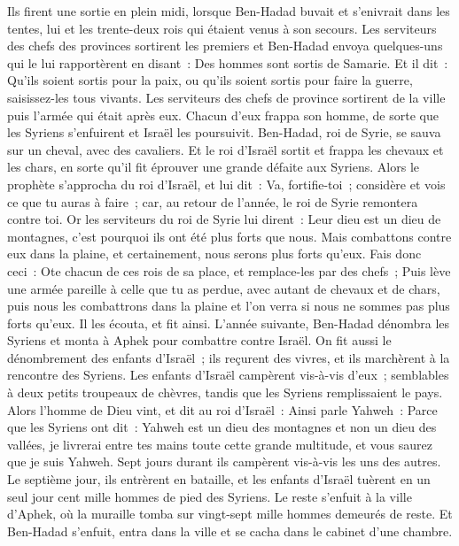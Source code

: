 \begin{multicols}{2}
Ils firent une sortie en plein midi, lorsque Ben-Hadad buvait et s'enivrait dans les tentes, lui et les trente-deux rois qui étaient venus à son secours.
Les serviteurs des chefs des provinces sortirent les premiers et Ben-Hadad envoya quelques-uns qui le lui rapportèrent en disant~: Des hommes sont sortis de Samarie.
Et il dit~: Qu'ils soient sortis pour la paix, ou qu'ils soient sortis pour faire la guerre, saisissez-les tous vivants.
Les serviteurs des chefs de province sortirent de la ville puis l'armée qui était après eux.
Chacun d'eux frappa son homme, de sorte que les Syriens s'enfuirent et Israël les poursuivit. Ben-Hadad, roi de Syrie, se sauva sur un cheval, avec des cavaliers.
Et le roi d'Israël sortit et frappa les chevaux et les chars, en sorte qu'il fit éprouver une grande défaite aux Syriens.
Alors le prophète s'approcha du roi d'Israël, et lui dit~: Va, fortifie-toi~; considère et vois ce que tu auras à faire~; car, au retour de l'année, le roi de Syrie remontera contre toi.
Or les serviteurs du roi de Syrie lui dirent~: Leur dieu est un dieu de montagnes, c'est pourquoi ils ont été plus forts que nous. Mais combattons contre eux dans la plaine, et certainement, nous serons plus forts qu'eux.
Fais donc ceci~: Ote chacun de ces rois de sa place, et remplace-les par des chefs~;
Puis lève une armée pareille à celle que tu as perdue, avec autant de chevaux et de chars, puis nous les combattrons dans la plaine et l'on verra si nous ne sommes pas plus forts qu'eux. Il les écouta, et fit ainsi.
L'année suivante, Ben-Hadad dénombra les Syriens et monta à Aphek pour combattre contre Israël.
On fit aussi le dénombrement des enfants d'Israël~; ils reçurent des vivres, et ils marchèrent à la rencontre des Syriens. Les enfants d'Israël campèrent vis-à-vis d'eux~; semblables à deux petits troupeaux de chèvres, tandis que les Syriens remplissaient le pays.
Alors l'homme de Dieu vint, et dit au roi d'Israël~: Ainsi parle Yahweh~: Parce que les Syriens ont dit~: Yahweh est un dieu des montagnes et non un dieu des vallées, je livrerai entre tes mains toute cette grande multitude, et vous saurez que je suis Yahweh.
Sept jours durant ils campèrent vis-à-vis les uns des autres. Le septième jour, ils entrèrent en bataille, et les enfants d'Israël tuèrent en un seul jour cent mille hommes de pied des Syriens.
Le reste s'enfuit à la ville d'Aphek, où la muraille tomba sur vingt-sept mille hommes demeurés de reste. Et Ben-Hadad s'enfuit, entra dans la ville et se cacha dans le cabinet d'une chambre. 

\end{multicols}
